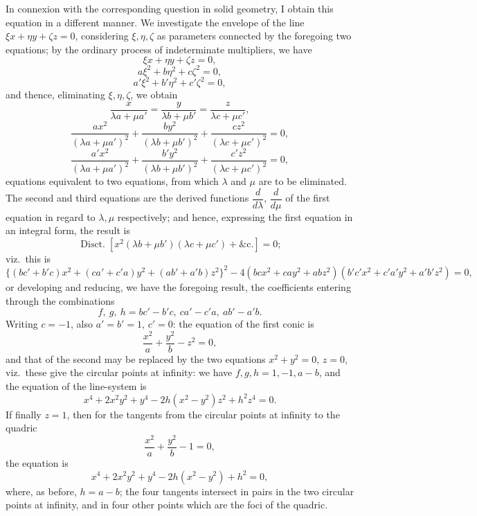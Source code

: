 \documentclass[11pt,a4paper]{article}
\providecommand{\Disct}{\operatorname{Disct.}}
\begin{document}
In connexion with the corresponding question in solid geometry, I obtain this equation in a different manner. We investigate the envelope of the line $\xi x + \eta y + \zeta z = 0$, considering $\xi, \eta, \zeta$ as parameters connected by the foregoing two equations; by the ordinary process of indeterminate multipliers, we have
\[
\xi x + \eta y + \zeta z = 0,
\]
\[
a \xi^2 + b \eta^2 + c \zeta^2 = 0,
\]
\[
a' \xi^2 + b' \eta^2 + c' \zeta^2 = 0,
\]
and thence, eliminating $\xi, \eta, \zeta$, we obtain
\[
\frac{x}{\lambda a + \mu a'} = \frac{y}{\lambda b + \mu b'} = \frac{z}{\lambda c + \mu c'},
\]
\[
\frac{a x^2}{(\lambda a + \mu a')^2} + \frac{b y^2}{(\lambda b + \mu b')^2} + \frac{c z^2}{(\lambda c + \mu c')^2} = 0,
\]
\[
\frac{a' x^2}{(\lambda a + \mu a')^2} + \frac{b' y^2}{(\lambda b + \mu b')^2} + \frac{c' z^2}{(\lambda c + \mu c')^2} = 0,
\]
equations equivalent to two equations, from which $\lambda$ and $\mu$ are to be eliminated. The second and third equations are the derived functions $\dfrac{d}{d\lambda}$, $\dfrac{d}{d\mu}$ of the first equation in regard to $\lambda, \mu$ respectively; and hence, expressing the first equation in an integral form, the result is
\[
\Disct \left[x^2 (\lambda b + \mu b')(\lambda c + \mu c') + \&\text{c}.\right] = 0;
\]
viz.\ this is
\[
\{(bc' + b'c) x^2 + (ca' + c'a) y^2 + (ab' + a'b) z^2\}^2 - 4(bc x^2 + ca y^2 + ab z^2)(b'c' x^2 + c'a' y^2 + a'b' z^2) = 0,
\]
or developing and reducing, we have the foregoing result, the coefficients entering through the combinations
\[
f,\ g,\ h = bc' - b'c,\ ca' - c'a,\ ab' - a'b.
\]
Writing $c = -1$, also $a' = b' = 1$, $c' = 0$: the equation of the first conic is
\[
\frac{x^2}{a} + \frac{y^2}{b} - z^2 = 0,
\]
and that of the second may be replaced by the two equations $x^2 + y^2 = 0$, $z = 0$, viz.\ these give the circular points at infinity: we have $f, g, h = 1, -1, a - b$, and the equation of the line-system is
\[
x^4 + 2 x^2 y^2 + y^4 - 2 h(x^2 - y^2) z^2 + h^2 z^4 = 0.
\]
If finally $z = 1$, then for the tangents from the circular points at infinity to the quadric
\[
\frac{x^2}{a} + \frac{y^2}{b} - 1 = 0,
\]
the equation is
\[
x^4 + 2 x^2 y^2 + y^4 - 2h(x^2 - y^2) + h^2 = 0,
\]
where, as before, $h = a - b$; the four tangents intersect in pairs in the two circular points at infinity, and in four other points which are the foci of the quadric.

\medskip
\end{document}
